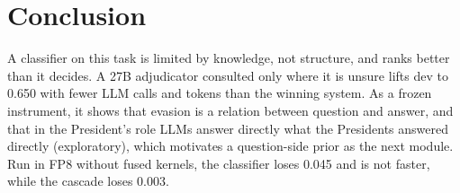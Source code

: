 \section{Conclusion}
\label{sec:conclusion}

A classifier on this task is limited by knowledge, not structure, and ranks better than it decides. A 27B adjudicator consulted only where it is unsure lifts dev \Stwo{} to 0.650 with fewer LLM calls and tokens than the winning system.
As a frozen instrument, it shows that evasion is a relation between question and answer, and that in the President's role LLMs answer directly what the Presidents answered directly (exploratory), which motivates a question-side prior as the next module. Run in FP8 without fused kernels, the classifier loses 0.045 \Stwo{} and is not faster, while the cascade loses 0.003.
